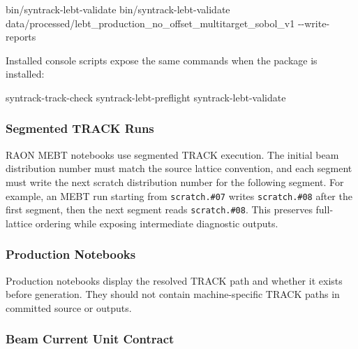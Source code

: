 \documentclass[
]{article}
\newenvironment{Shaded}{}{}
\newcommand{\AttributeTok}[1]{\textcolor[rgb]{0.49,0.56,0.16}{#1}}
\newcommand{\ExtensionTok}[1]{#1}
\newcommand{\NormalTok}[1]{#1}
\begin{document}
\begin{Shaded}
\begin{Highlighting}[]
\ExtensionTok{bin/syntrack{-}lebt{-}validate}
\ExtensionTok{bin/syntrack{-}lebt{-}validate}\NormalTok{ data/processed/lebt\_production\_no\_offset\_multitarget\_sobol\_v1 }\AttributeTok{{-}{-}write{-}reports}
\end{Highlighting}
\end{Shaded}

Installed console scripts expose the same commands when the package is
installed:

\begin{Shaded}
\begin{Highlighting}[]
\ExtensionTok{syntrack{-}track{-}check}
\ExtensionTok{syntrack{-}lebt{-}preflight}
\ExtensionTok{syntrack{-}lebt{-}validate}
\end{Highlighting}
\end{Shaded}

\hypertarget{segmented-track-runs}{%
\subsubsection{Segmented TRACK Runs}\label{segmented-track-runs}}

RAON MEBT notebooks use segmented TRACK execution. The initial beam
distribution number must match the source lattice convention, and each
segment must write the next scratch distribution number for the
following segment. For example, an MEBT run starting from
\texttt{scratch.\#07} writes \texttt{scratch.\#08} after the first
segment, then the next segment reads \texttt{scratch.\#08}. This
preserves full-lattice ordering while exposing intermediate diagnostic
outputs.

\hypertarget{production-notebooks}{%
\subsubsection{Production Notebooks}\label{production-notebooks}}

Production notebooks display the resolved TRACK path and whether it
exists before generation. They should not contain machine-specific TRACK
paths in committed source or outputs.

\hypertarget{beam-current-unit-contract}{%
\subsubsection{Beam Current Unit
Contract}\label{beam-current-unit-contract}}
\end{document}
